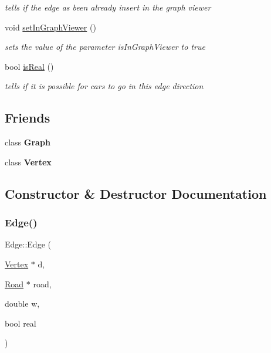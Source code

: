 \begin{DoxyCompactItemize}
\begin{DoxyCompactList}\small\item\em tells if the edge as been already insert in the graph viewer \end{DoxyCompactList}\item 
\hypertarget{class_edge_acc1c45aaa9eeb6e9005e3dbd0a8f48b7}{}\label{class_edge_acc1c45aaa9eeb6e9005e3dbd0a8f48b7} 
void \hyperlink{class_edge_acc1c45aaa9eeb6e9005e3dbd0a8f48b7}{set\+In\+Graph\+Viewer} ()
\begin{DoxyCompactList}\small\item\em sets the value of the parameter is\+In\+Graph\+Viewer to true \end{DoxyCompactList}\item 
bool \hyperlink{class_edge_a10128890aff4f38cb7a992ce8c113255}{is\+Real} ()
\begin{DoxyCompactList}\small\item\em tells if it is possible for cars to go in this edge direction \end{DoxyCompactList}\end{DoxyCompactItemize}
\subsection*{Friends}
\begin{DoxyCompactItemize}
\item 
\hypertarget{class_edge_afab89afd724f1b07b1aaad6bdc61c47a}{}\label{class_edge_afab89afd724f1b07b1aaad6bdc61c47a} 
class {\bfseries Graph}
\item 
\hypertarget{class_edge_a1251d18f08324022e8e73506c3768f3c}{}\label{class_edge_a1251d18f08324022e8e73506c3768f3c} 
class {\bfseries Vertex}
\end{DoxyCompactItemize}


\subsection{Constructor \& Destructor Documentation}
\hypertarget{class_edge_ab1bd2846a532b77ad8ec13c162542a1e}{}\label{class_edge_ab1bd2846a532b77ad8ec13c162542a1e} 
\subsubsection{\texorpdfstring{Edge()}{Edge()}}
{\footnotesize\ttfamily Edge\+::\+Edge (\begin{DoxyParamCaption}\item[{\hyperlink{class_vertex}{Vertex} $\ast$}]{d,  }\item[{\hyperlink{class_road}{Road} $\ast$}]{road,  }\item[{double}]{w,  }\item[{bool}]{real }\end{DoxyParamCaption})}



